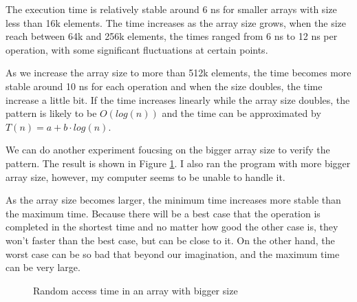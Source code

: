 \documentclass[a4paper,11pt]{article}
\begin{document}
The execution time is relatively stable around 6 ns for smaller arrays with size less 
than 16k elements. The time increases as the array size grows, when the size reach between
64k and 256k elements, the times ranged from 6 ns to 12 ns per operation, with some
significant fluctuations at certain points. 

As we increase the array size to more than 512k elements,
the time becomes more stable around 10 ns for each operation and when the size doubles, the time
increase a little bit. If the time increases linearly while the array size doubles, the pattern is likely
to be $O(log(n))$ and the time can be approximated by $T(n) = a + b \cdot log(n)$. 

We can do another experiment foucsing on the bigger array size to verify the pattern. 
The result is shown in Figure \ref{fig:random_access_big}.
I also ran the program with more bigger array size, however, my computer seems to be unable to handle it.

As the array size becomes larger, the minimum time increases more stable than the maximum time.
Because there will be a best case that the operation is completed in the shortest time and no 
matter how good the other case is, they won't faster than the best case, but can be close to it.
On the other hand, the worst case can be so bad that beyond our imagination, and the maximum time
can be very large.

\begin{figure}[H]
  \centering
  \caption{Random access time in an array with bigger size}
  \label{fig:random_access_big}
\end{figure}
\end{document}

